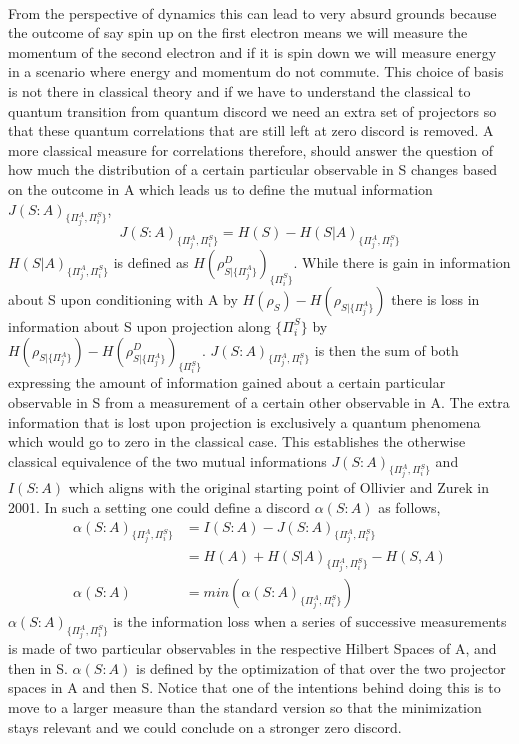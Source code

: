 \documentclass[8pt]{article}
\begin{document}
\\
From the perspective of dynamics this can lead to very absurd grounds because the outcome of say spin up on the first electron means we will measure the momentum of the second electron and if it is spin down we will measure energy in a scenario where energy and momentum do not commute. This choice of basis is not there in classical theory and if we have to understand the classical to quantum transition from quantum discord we need an extra set of projectors so that these quantum correlations that are still left at zero discord is removed. A more classical measure for correlations therefore, should answer the question of how much the distribution of a certain particular observable in S changes based on the outcome in A which leads us to define the mutual information ${J(S:A)}_{\{{\Pi}^{A}_{j},{\Pi}^{S}_{i}\}}$,
\[{J(S:A)}_{\{{\Pi}^{A}_{j},{\Pi}^{S}_{i}\}} = H(S) - H(S|A)_{\{{\Pi}^{A}_{j},{\Pi}^{S}_{i}\}}\]
$H(S|A)_{\{{\Pi}^{A}_{j},{\Pi}^{S}_{i}\}}$ is defined as $H(\rho^{\scriptscriptstyle{D}}_{\scriptscriptstyle{{S|\{\Pi^A_{j}\}}}})_{\{\Pi^S_{i}\}}$. While there is gain in information about S upon conditioning with A by $H(\rho_{\scriptscriptstyle{S}}) - H(\rho_{\scriptscriptstyle{S}|\{\Pi^A_{j}\}})$ there is loss in information about S upon projection along $\{\Pi^S_{i}\}$ by $H(\rho_{\scriptscriptstyle{S}|\{\Pi^A_{j}\}}) - H(\rho^{\scriptscriptstyle{D}}_{\scriptscriptstyle{{S|\{\Pi^A_{j}\}}}})_{\{\Pi^S_{i}\}}$. ${J(S:A)}_{\{{\Pi}^{A}_{j},{\Pi}^{S}_{i}\}}$ is then the sum of both expressing the amount of information gained about a certain particular observable in S from a measurement of a certain other observable in A. The extra information that is lost upon projection is exclusively a quantum phenomena which would go to zero in the classical case. This establishes the otherwise classical equivalence of the two mutual informations ${J(S:A)}_{\{{\Pi}^{A}_{j},{\Pi}^{S}_{i}\}}$ and $I(S:A)$ which aligns with the original starting point of Ollivier and Zurek in 2001. In such a setting one could define a discord $\alpha(S:A)$ as follows,   
\begin{align*}
    \alpha(S:A)_{\{{\Pi}^{A}_{j},{\Pi}^{S}_{i}\}} 
    &= I(S:A)-{J(S:A)}_{\{{\Pi}^{A}_{j},{\Pi}^{S}_{i}\}}\\
    &= H(A)+H(S|A)_{\{{\Pi}^{A}_{j},{\Pi}^{S}_{i}\}}-H(S,A)\\
    \alpha(S:A) &= min(\alpha(S:A)_{\{{\Pi}^{A}_{j},{\Pi}^{S}_{i}\}})
\end{align*}
$\alpha(S:A)_{\{{\Pi}^{A}_{j},{\Pi}^{S}_{i}\}}$ is the information loss when a series of successive measurements is made of two particular observables in the respective Hilbert Spaces of A, and then in S. $\alpha(S:A)$ is defined by the optimization of that over the two projector spaces in A and then S. Notice that one of the intentions behind doing this is to move to a larger measure than the standard version so that the minimization stays relevant and we could conclude on a stronger zero discord.
\end{document}
